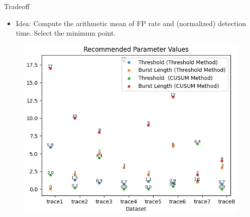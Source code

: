 \documentclass[aspectratio=169, 8pt]{beamer}
\begin{document}
\begin{frame}

\begin{columns}[T]

    \begin{column}{0.5\linewidth}
    
        \begin{block}{Tradeoff}
            \begin{itemize}
                \item Idea: Compute the arithmetic mean of FP rate and (normalized) detection time. Select the minimum point.
            \end{itemize}
        \end{block}

        \begin{figure}
            \centering
            \includegraphics[width = \textwidth]{images/Recommended_Values.png}
            \label{fig:enter-label}
        \end{figure}        
        
    \end{column}
    

\end{columns}
\end{frame}
\end{document}
